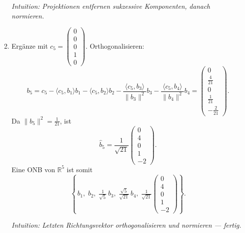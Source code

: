 \documentclass[11pt, a4paper]{article}
\begin{document}
\begin{enumerate}
  \medskip\noindent\textit{Intuition: Projektionen entfernen sukzessive Komponenten, danach normieren.}

  \item
  Ergänze mit $c_5=\begin{pmatrix}0\\0\\0\\1\\0\end{pmatrix}$. Orthogonalisieren:
  \[
  b_5=c_5-\langle c_5,b_1\rangle b_1-\langle c_5,b_2\rangle b_2
      -\frac{\langle c_5,b_3\rangle}{\|b_3\|^2}b_3
      -\frac{\langle c_5,b_4\rangle}{\|b_4\|^2}b_4
      =\begin{pmatrix}0\\\tfrac{4}{21}\\0\\\tfrac{1}{21}\\-\tfrac{2}{21}\end{pmatrix}.
  \]
  Da $\|b_5\|^2=\tfrac{1}{21}$, ist
  \[
   \widehat b_5=\frac{1}{\sqrt{21}}\begin{pmatrix}0\\4\\0\\1\\-2\end{pmatrix}.
  \]
  Eine ONB von $\mathbb{R}^5$ ist somit
  \[
  \left\{\, b_{1},\; b_{2},\; \tfrac{1}{\sqrt5}\,b_{3},\;
  \tfrac{\sqrt5}{\sqrt{21}}\,b_{4},\;
  \tfrac{1}{\sqrt{21}}\begin{pmatrix}0\\4\\0\\1\\-2\end{pmatrix}\right\}.
  \]

  \medskip\noindent\textit{Intuition: Letzten Richtungsvektor orthogonalisieren und normieren — fertig.}
\end{enumerate}
\end{document}
